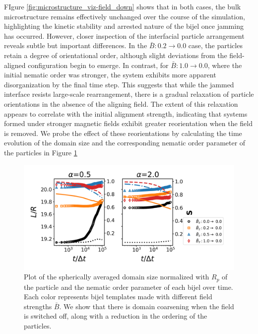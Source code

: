 FIgure \ref{fig:microstructure_viz-field_down} shows that in 
both cases, the bulk microstructure remains effectively unchanged over the course of the simulation, highlighting the 
kinetic stability and arrested nature of the bijel once jamming has occurred.
However, closer inspection of the interfacial particle arrangement reveals subtle but important differences. In the 
\(\bar{B}: 0.2 \rightarrow 0.0\) case, the particles retain a degree of orientational order, although slight deviations 
from the field-aligned configuration begin to emerge. In contrast, for \(\bar{B}: 1.0 \rightarrow 0.0\), where the 
initial nematic order was stronger, the system exhibits more apparent disorganization by the final time step. This 
suggests that while the jammed interface resists large-scale rearrangement, there is a gradual relaxation of particle 
orientations in the absence of the aligning field. The extent of this relaxation appears to correlate with the initial 
alignment strength, indicating that systems formed under stronger magnetic fields exhibit greater reorientation when 
the field is removed. We probe the effect of these reorientations by calculating the time evolution of the domain size
and the corresponding nematic order parameter of the particles in Figure \ref{fig:domain_size-field_down}

\begin{figure} 
\centering 
\includegraphics[scale=0.5]{../figures/results/paper2/domain_size-field_down.png} 
\caption{Plot of the spherically averaged domain size normalized with $R_p$ of the particle and the nematic order parameter of each bijel over time. 
         Each color represents bijel templates made with different field strengths $\bar{B}$. We show that there is domain coarsening when the field 
         is switched off, along with a reduction in the ordering of the particles.} 
\label{fig:domain_size-field_down} 
\end{figure}

